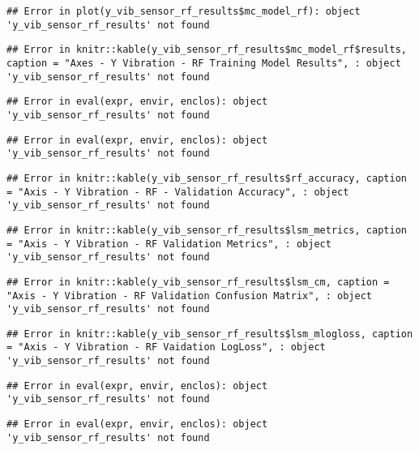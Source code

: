\documentclass[]{article}
\begin{document}
\begin{verbatim}
## Error in plot(y_vib_sensor_rf_results$mc_model_rf): object 'y_vib_sensor_rf_results' not found
\end{verbatim}

\begin{verbatim}
## Error in knitr::kable(y_vib_sensor_rf_results$mc_model_rf$results, caption = "Axes - Y Vibration - RF Training Model Results", : object 'y_vib_sensor_rf_results' not found
\end{verbatim}

\begin{verbatim}
## Error in eval(expr, envir, enclos): object 'y_vib_sensor_rf_results' not found
\end{verbatim}

\begin{verbatim}
## Error in eval(expr, envir, enclos): object 'y_vib_sensor_rf_results' not found
\end{verbatim}

\begin{verbatim}
## Error in knitr::kable(y_vib_sensor_rf_results$rf_accuracy, caption = "Axis - Y Vibration - RF - Validation Accuracy", : object 'y_vib_sensor_rf_results' not found
\end{verbatim}

\begin{verbatim}
## Error in knitr::kable(y_vib_sensor_rf_results$lsm_metrics, caption = "Axis - Y Vibration - RF Validation Metrics", : object 'y_vib_sensor_rf_results' not found
\end{verbatim}

\begin{verbatim}
## Error in knitr::kable(y_vib_sensor_rf_results$lsm_cm, caption = "Axis - Y Vibration - RF Validation Confusion Matrix", : object 'y_vib_sensor_rf_results' not found
\end{verbatim}

\begin{verbatim}
## Error in knitr::kable(y_vib_sensor_rf_results$lsm_mlogloss, caption = "Axis - Y Vibration - RF Vaidation LogLoss", : object 'y_vib_sensor_rf_results' not found
\end{verbatim}

\begin{verbatim}
## Error in eval(expr, envir, enclos): object 'y_vib_sensor_rf_results' not found
\end{verbatim}

\begin{verbatim}
## Error in eval(expr, envir, enclos): object 'y_vib_sensor_rf_results' not found
\end{verbatim}
\end{document}
